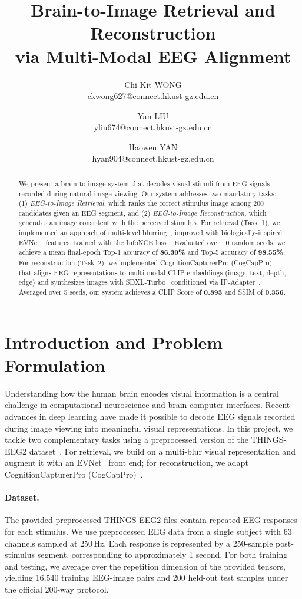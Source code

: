 \documentclass[11pt]{article}
\title{\textbf{Brain-to-Image Retrieval and Reconstruction\\ via Multi-Modal EEG Alignment}\\[0.5em]
\large }
\author{
  \normalfont Chi Kit WONG \\ ckwong627@connect.hkust-gz.edu.cn\\
  \and
  Yan LIU \\
  yliu674@connect.hkust-gz.edu.cn\\
  \and
  Haowen YAN \\ hyan904@connect.hkust-gz.edu.cn\\
}
\date{}
\begin{document}
\maketitle

\begin{abstract}
We present a brain-to-image system that decodes visual stimuli from EEG signals recorded during natural image viewing.
Our system addresses two mandatory tasks: (1) \emph{EEG-to-Image Retrieval}, which ranks the correct stimulus image among 200 candidates given an EEG segment, and (2) \emph{EEG-to-Image Reconstruction}, which generates an image consistent with the perceived stimulus.
For retrieval (Task~1), we implemented an approach of multi-level blurring~\citep{ved2026}, improved with biologically-inspired EVNet~\citep{evnet2025} features, trained with the InfoNCE loss~\citep{oord2018cpc}.
Evaluated over 10 random seeds, we achieve a mean final-epoch Top-1 accuracy of \textbf{86.30\%} and Top-5 accuracy of \textbf{98.55\%}.
For reconstruction (Task~2), we implemented CognitionCapturerPro (CogCapPro)~\citep{ccp2026} that aligns EEG representations to multi-modal CLIP embeddings (image, text, depth, edge) and synthesizes images with SDXL-Turbo~\citep{sauer2023sdxlturbo} conditioned via IP-Adapter~\citep{ye2023ipadapter}.
Averaged over 5 seeds, our system achieves a CLIP Score of \textbf{0.893} and SSIM of \textbf{0.356}.
\end{abstract}

\section{Introduction and Problem Formulation}

Understanding how the human brain encodes visual information is a central challenge in computational neuroscience and brain-computer interfaces.
Recent advances in deep learning have made it possible to decode EEG signals recorded during image viewing into meaningful visual representations.
In this project, we tackle two complementary tasks using a preprocessed version of the THINGS-EEG2 dataset~\citep{gifford2022thingseeg2data}. For retrieval, we build on a multi-blur visual representation and augment it with an EVNet~\citep{evnet2025} front end; for reconstruction, we adapt CognitionCapturerPro (CogCapPro)~\citep{ccp2026}.

\paragraph{Dataset.}
The provided preprocessed THINGS-EEG2 files contain repeated EEG responses for each stimulus.
We use preprocessed EEG data from a single subject with 63 channels sampled at 250\,Hz.
Each response is represented by a 250-sample post-stimulus segment, corresponding to approximately 1 second.
For both training and testing, we average over the repetition dimension of the provided tensors, yielding 16,540 training EEG-image pairs and 200 held-out test samples under the official 200-way protocol.
\end{document}
